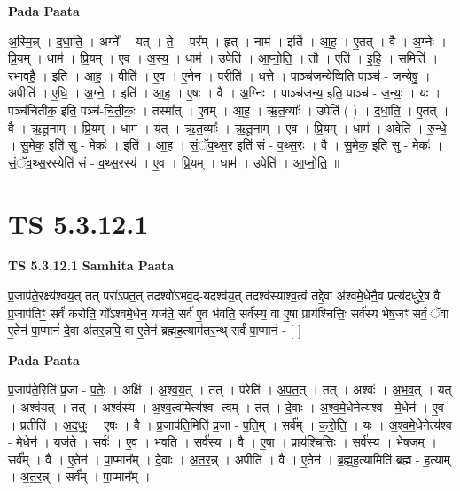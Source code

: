 \documentclass[17pt]{extarticle}
\begin{document}
\textbf{Pada Paata} \newline

अ॒स्मि॒न्न् । द॒धा॒ति॒ । अग्ने᳚ । यत् । ते॒ । पर᳚म् । हृत् । नाम॑ । इति॑ । आ॒ह॒ । ए॒तत् । वै । अ॒ग्नेः । प्रि॒यम् । धाम॑ । प्रि॒यम् । ए॒व । अ॒स्य॒ । धाम॑ । उपेति॑ । आ॒प्नो॒ति॒ । तौ । एति॑ । इ॒हि॒ । समिति॑ । र॒भा॒व॒है॒ । इति॑ । आ॒ह॒ । वीति॑ । ए॒व । ए॒ने॒न॒ । परीति॑ । ध॒त्ते॒ । पाञ्च॑जन्ये॒ष्विति॒ पाञ्च॑ - ज॒न्ये॒षु॒ । अपीति॑ । ए॒धि॒ । अ॒ग्ने॒ । इति॑ । आ॒ह॒ । ए॒षः । वै । अ॒ग्निः । पाञ्च॑जन्य॒ इति॒ पाञ्च॑ - ज॒न्यः॒ । यः । पञ्च॑चितीक॒ इति॒ पञ्च॑-चि॒ती॒कः॒ । तस्मा᳚त् । ए॒वम् । आ॒ह॒ । ऋ॒त॒व्याः᳚ । उपेति॑ ( ) । द॒धा॒ति॒ । ए॒तत् । वै । ऋ॒तू॒नाम् । प्रि॒यम् । धाम॑ । यत् । ऋ॒त॒व्याः᳚ । ऋ॒तू॒नाम् । ए॒व । प्रि॒यम् । धाम॑ । अवेति॑ । रु॒न्धे॒ । सु॒मेक॒ इति॑ सु - मेकः॑ । इति॑ । आ॒ह॒ । सं॒ॅव॒थ्स॒र इति॑ सं - व॒थ्स॒रः । वै । सु॒मेक॒ इति॑ सु - मेकः॑ । सं॒ॅव॒थ्स॒रस्येति॑ सं - व॒थ्स॒रस्य॑ । ए॒व । प्रि॒यम् । धाम॑ । उपेति॑ । आ॒प्नो॒ति॒ ॥  \newline





\section{ TS 5.3.12.1 }

\textbf{TS 5.3.12.1 } \newline
\textbf{Samhita Paata} \newline

प्र॒जाप॑ते॒रक्ष्य॑श्वय॒त् तत् परा॑ऽपत॒त् तदश्वो॑ऽभव॒द्-यदश्व॑य॒त् तदश्व॑स्याश्व॒त्वं तद्दे॒वा अ॑श्वमे॒धेनै॒व प्रत्य॑दधुरे॒ष वै प्र॒जाप॑तिꣳ॒॒ सर्वं॑ करोति॒ यो᳚ऽश्वमे॒धेन॒ यज॑ते॒ सर्व॑ ए॒व भ॑वति॒ सर्व॑स्य॒ वा ए॒षा प्राय॑श्चित्तिः॒ सर्व॑स्य भेष॒जꣳ सर्वं॒ ॅवा ए॒तेन॑ पा॒प्मानं॑ दे॒वा अ॑तर॒न्नपि॒ वा ए॒तेन॑ ब्रह्मह॒त्याम॑तर॒न्थ् सर्वं॑ पा॒प्मानं॑ - [  ] \newline

\textbf{Pada Paata} \newline

प्र॒जाप॑ते॒रिति॑ प्र॒जा - प॒तेः॒ । अक्षि॑ । अ॒श्व॒य॒त् । तत् । परेति॑ । अ॒प॒त॒त् । तत् । अश्वः॑ । अ॒भ॒व॒त् । यत् । अश्व॑यत् । तत् । अश्व॑स्य । अ॒श्व॒त्वमित्य॑श्व- त्वम् । तत् । दे॒वाः । अ॒श्व॒मे॒धेनेत्य॑श्व - मे॒धेन॑ । ए॒व । प्रतीति॑ । अ॒द॒धुः॒ । ए॒षः । वै । प्र॒जाप॑ति॒मिति॑ प्र॒जा - प॒ति॒म् । सर्व᳚म् । क॒रो॒ति॒ । यः । अ॒श्व॒मे॒धेनेत्य॑श्व - मे॒धेन॑ । यज॑ते । सर्वः॑ । ए॒व । भ॒व॒ति॒ । सर्व॑स्य । वै । ए॒षा । प्राय॑श्चित्तिः । सर्व॑स्य । भे॒ष॒जम् । सर्व᳚म् । वै । ए॒तेन॑ । पा॒प्मान᳚म् । दे॒वाः । अ॒त॒र॒न्न् । अपीति॑ । वै । ए॒तेन॑ । ब्र॒ह्म॒ह॒त्यामिति॑ ब्रह्म - ह॒त्याम् । अ॒त॒र॒न्न् । सर्व᳚म् । पा॒प्मान᳚म् ।  \newline
\end{document}
